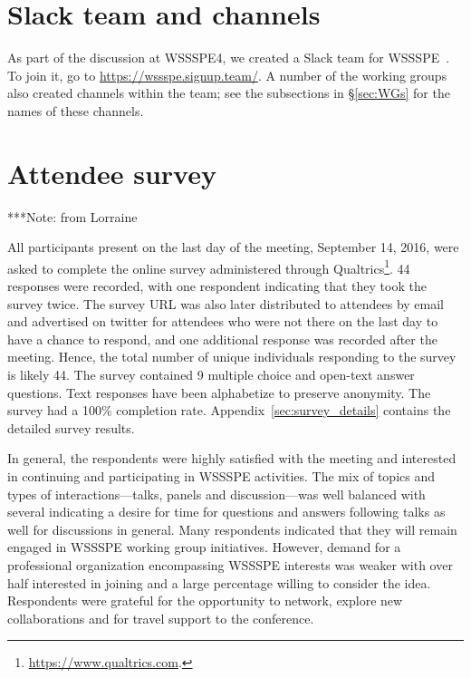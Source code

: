 \documentclass[11pt, oneside]{amsart}
\newcommand{\note}[1]{ {\textcolor{blueish}    { ***Note:      #1 }}}
\begin{document}
\section{Slack team and channels}\label{sec:slack}


As part of the discussion at WSSSPE4, we created a Slack team for WSSSPE~\cite{WSSSPESlack}.  To join it, go to \url{https://wssspe.signup.team/}.  A number of the working groups also created channels within the team; see the subsections in \S\ref{sec:WGs} for the names of these channels.


\section{Attendee survey \label{sec:survey}}

\note{from Lorraine}

All participants present on the last day of the meeting, September 14, 2016, were asked to complete the online survey administered through Qualtrics\footnote{\url{https://www.qualtrics.com}.}.
44 responses were recorded, with one respondent indicating that they took the survey twice.
The survey URL was also later distributed to attendees by email and advertised on twitter for attendees who were not there on the last day to have a chance to respond, and one additional response was recorded after the meeting.
Hence, the total number of unique individuals responding to the survey is likely 44.
The survey contained 9 multiple choice and open-text answer questions.
Text responses have been alphabetize to preserve anonymity.
The survey had a 100\% completion rate.
Appendix~\ref{sec:survey_details} contains the detailed survey results.

In general, the respondents were highly satisfied with the meeting and interested in continuing and participating in WSSSPE activities.
The mix of topics and types of interactions---talks, panels and discussion---was well balanced with several indicating a desire for time for questions and answers following talks as well for discussions in general.
Many respondents indicated that they will remain engaged in WSSSPE working group initiatives.
However, demand for a professional organization encompassing WSSSPE interests was weaker with over half interested in joining and a large percentage willing to consider the idea.
Respondents were grateful for the opportunity to network, explore new collaborations and for travel support to the conference.
\end{document}

